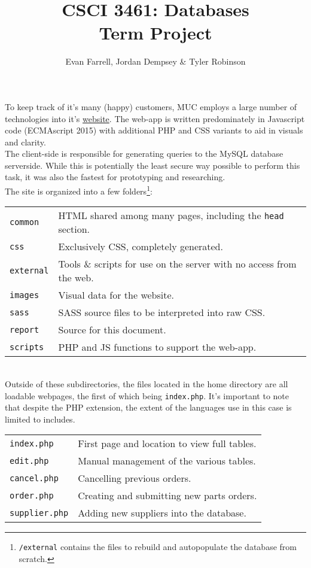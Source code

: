 \documentclass{article}
\title{CSCI 3461: Databases\\Term Project}
\author{Evan Farrell, Jordan Dempsey \& Tyler Robinson}
\begin{document}
\maketitle
\clearpage

To keep track of it's many (happy) customers, MUC employs a large number of technologies into it's \href{http://csci3461.cs.smu.ca/~tj_robinson/}{website}. The web-app is written predominately in Javascript code (ECMAscript 2015) with additional PHP and CSS variants to aid in visuals and clarity. \\

The client-side is responsible for generating queries to the MySQL database serverside. While this is potentially the least secure way possible to perform this task, it was also the fastest for prototyping and researching. \\

The site is organized into a few folders\footnote{\texttt{/external} contains the files to rebuild and autopopulate the database from scratch.}:\\

\begin{tabular}{|l|l|}
\hline
\texttt{common} & HTML shared among many pages, including the \texttt{head} section. \\
\texttt{css} & Exclusively CSS, completely generated.\\
\texttt{external} & Tools \& scripts for use on the server with no access from the web. \\
\texttt{images} & Visual data for the website.\\
\texttt{sass} & SASS source files to be interpreted into raw CSS. \\
\texttt{report} & Source for this document. \\
\texttt{scripts} & PHP and JS functions  to support the web-app.\\
\hline
\end{tabular}
\\

Outside of these subdirectories, the files located in the home directory are all loadable webpages, the first of which being \texttt{index.php}. It's important to note that despite the PHP extension, the extent of the languages use in this case is limited to includes.\\

\begin{tabular}{|l|l|}
\hline
\texttt{index.php} & First page and location to view full tables. \\
\texttt{edit.php} & Manual management of the various tables.\\
\texttt{cancel.php} & Cancelling previous orders. \\
\texttt{order.php} & Creating and submitting new parts orders.\\
\texttt{supplier.php} & Adding new suppliers into the database. \\
\hline
\end{tabular}
\vspace{.5cm}
\end{document}
